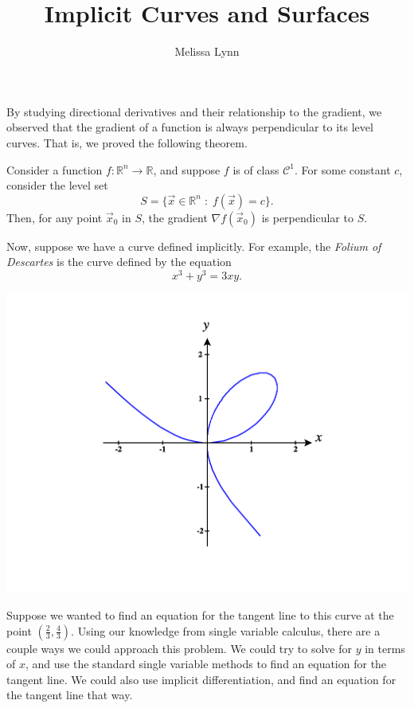 \documentclass{ximera}
\title{Implicit Curves and Surfaces}
\author{Melissa Lynn}
\begin{document}
\begin{abstract}
\end{abstract}
\maketitle

By studying directional derivatives and their relationship to the gradient, we observed that the gradient of a function is always perpendicular to its level curves.  That is, we proved the following theorem.

\begin{theorem}
Consider a function $f:\mathbb{R}^n\rightarrow\mathbb{R}$, and suppose $f$ is of class $\mathcal{C}^1$. For some constant $c$, consider the level set
\[
S = \{\vec{x}\in\mathbb{R}^n\;:\;f(\vec{x})=c\}.
\]
Then, for any point $\vec{x}_0$ in $S$, the gradient $\nabla f(\vec{x}_0)$ is perpendicular to $S$.
\end{theorem}

Now, suppose we have a curve defined implicitly. For example, the \emph{Folium of Descartes} is the curve defined by the equation
\[
x^3+y^3=3xy.
\]

\begin{image}
\includegraphics[width = \textwidth]{CalcPlot3D-folium}
\end{image}

Suppose we wanted to find an equation for the tangent line to this curve at the point $\left(\frac{2}{3}, \frac{4}{3}\right)$. Using our knowledge from single variable calculus, there are a couple ways we could approach this problem. We could try to solve for $y$ in terms of $x$, and use the standard single variable methods to find an equation for the tangent line. We could also use implicit differentiation, and find an equation for the tangent line that way.
\end{document}
